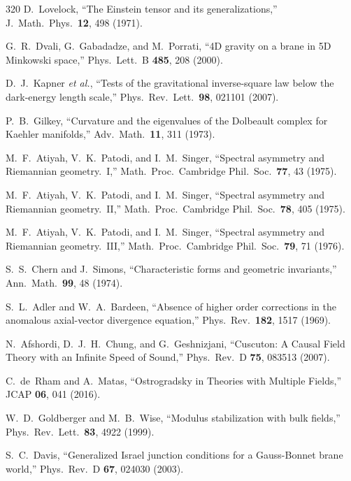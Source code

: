 \begin{thebibliography}{320}
D.~Lovelock,
``The Einstein tensor and its generalizations,''
J.\ Math.\ Phys.\ \textbf{12}, 498 (1971).

G.~R.~Dvali, G.~Gabadadze, and M.~Porrati,
``4D gravity on a brane in 5D Minkowski space,''
Phys.\ Lett.\ B \textbf{485}, 208 (2000).

D.~J.~Kapner \emph{et al.},
``Tests of the gravitational inverse-square law below the dark-energy length scale,''
Phys.\ Rev.\ Lett.\ \textbf{98}, 021101 (2007).

P.~B.~Gilkey,
``Curvature and the eigenvalues of the Dolbeault complex for Kaehler manifolds,''
Adv.\ Math.\ \textbf{11}, 311 (1973).

M.~F.~Atiyah, V.~K.~Patodi, and I.~M.~Singer,
``Spectral asymmetry and Riemannian geometry.~I,''
Math.\ Proc.\ Cambridge Phil.\ Soc.\ \textbf{77}, 43 (1975).

M.~F.~Atiyah, V.~K.~Patodi, and I.~M.~Singer,
``Spectral asymmetry and Riemannian geometry.~II,''
Math.\ Proc.\ Cambridge Phil.\ Soc.\ \textbf{78}, 405 (1975).

M.~F.~Atiyah, V.~K.~Patodi, and I.~M.~Singer,
``Spectral asymmetry and Riemannian geometry.~III,''
Math.\ Proc.\ Cambridge Phil.\ Soc.\ \textbf{79}, 71 (1976).

S.~S.~Chern and J.~Simons,
``Characteristic forms and geometric invariants,''
Ann.\ Math.\ \textbf{99}, 48 (1974).

S.~L.~Adler and W.~A.~Bardeen,
``Absence of higher order corrections in the anomalous axial-vector divergence equation,''
Phys.\ Rev.\ \textbf{182}, 1517 (1969).

N.~Afshordi, D.~J.~H.~Chung, and G.~Geshnizjani,
``Cuscuton: A Causal Field Theory with an Infinite Speed of Sound,''
Phys.\ Rev.\ D \textbf{75}, 083513 (2007).

C.~de~Rham and A.~Matas,
``Ostrogradsky in Theories with Multiple Fields,''
JCAP \textbf{06}, 041 (2016).

W.~D.~Goldberger and M.~B.~Wise,
``Modulus stabilization with bulk fields,''
Phys.\ Rev.\ Lett.\ \textbf{83}, 4922 (1999).

S.~C.~Davis,
``Generalized Israel junction conditions for a Gauss-Bonnet brane world,''
Phys.\ Rev.\ D \textbf{67}, 024030 (2003).


\end{thebibliography}

